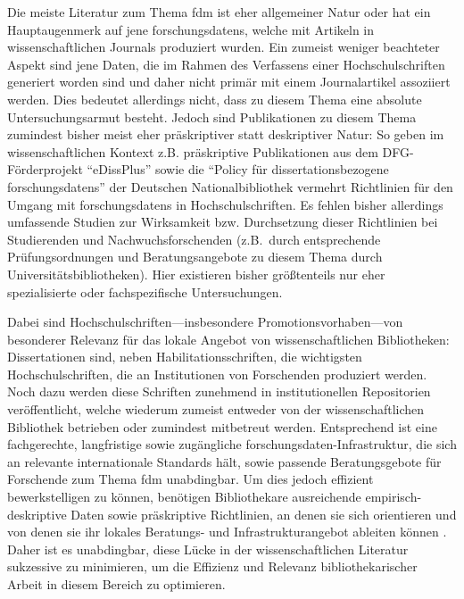 Die meiste Literatur zum Thema \gls{fdm} ist eher allgemeiner Natur oder hat ein Hauptaugenmerk auf jene \glspl{forschungsdaten}, welche mit Artikeln in wissenschaftlichen Journals produziert wurden. Ein zumeist weniger beachteter Aspekt sind jene Daten, die im Rahmen des Verfassens einer Hochschulschriften generiert worden sind und daher nicht primär mit einem Journalartikel assoziiert werden.
Dies bedeutet allerdings nicht, dass zu diesem Thema eine absolute Untersuchungsarmut besteht.
Jedoch sind Publikationen zu diesem Thema zumindest bisher meist eher präskriptiver statt deskriptiver Natur:
So geben im wissenschaftlichen Kontext z.B. präskriptive Publikationen aus dem DFG-Förderprojekt \enquote{eDissPlus} \autocite{Weisbrod2017eDissPlus, KleinebergKaden2018, Weisbrod2018} sowie die \enquote{Policy für dissertationsbezogene \glspl{forschungsdaten}} der Deutschen Nationalbibliothek \autocite{dnb2017} vermehrt Richtlinien für den Umgang mit \glspl{forschungsdaten} in Hochschulschriften.
Es fehlen bisher allerdings umfassende Studien zur Wirksamkeit bzw.
Durchsetzung dieser Richtlinien bei Studierenden und Nachwuchsforschenden (z.B.~durch entsprechende Prüfungsordnungen und Beratungsangebote zu diesem Thema durch Universitätsbibliotheken).
Hier existieren bisher größtenteils nur eher spezialisierte oder fachspezifische Untersuchungen.

Dabei sind Hochschulschriften---insbesondere Promotionsvorhaben---von besonderer Relevanz für das lokale Angebot von wissenschaftlichen Bibliotheken:
Dissertationen sind, neben Habilitationsschriften, die wichtigsten Hochschulschriften, die an Institutionen von Forschenden produziert werden.
Noch dazu werden diese Schriften zunehmend in institutionellen Repositorien veröffentlicht, welche wiederum zumeist entweder von der wissenschaftlichen Bibliothek betrieben oder zumindest mitbetreut werden.
Entsprechend ist eine fachgerechte, langfristige sowie zugängliche \gls{forschungsdaten}-Infrastruktur, die sich an relevante internationale Standards hält, sowie passende Beratungsgebote für Forschende zum Thema \gls{fdm} unabdingbar.
Um dies jedoch effizient bewerkstelligen zu können, benötigen Bibliothekare ausreichende empirisch-deskriptive Daten sowie präskriptive Richtlinien, an denen sie sich orientieren und von denen sie ihr lokales Beratungs- und Infrastrukturangebot ableiten können \autocite{Martin2013Wissenschaftliche}.
Daher ist es unabdingbar, diese Lücke in der wissenschaftlichen Literatur sukzessive zu minimieren, um die Effizienz und Relevanz bibliothekarischer Arbeit in diesem Bereich zu optimieren.

